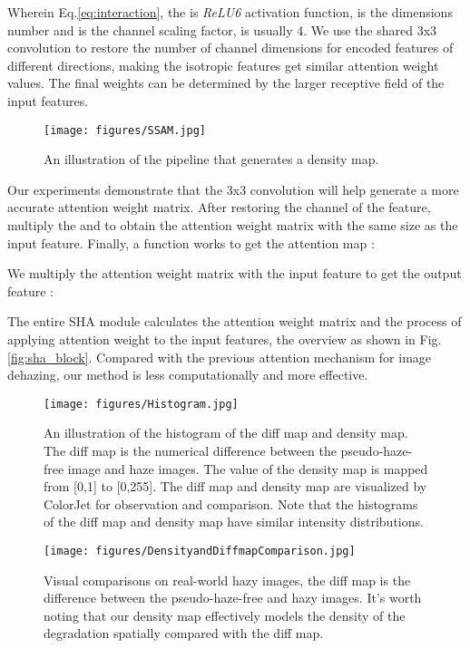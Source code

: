 \documentclass[final]{cvpr}
\begin{document}
Wherein Eq.\ref{eq:interaction}, the  is \textit{ReLU6} activation function,  is the dimensions number and  is the channel scaling factor,  is usually 4.
We use the shared 3x3 convolution to restore the number of channel dimensions for encoded features of different directions, making the isotropic features get similar attention weight values. The final weights can be determined by the larger receptive field of the input features.

\begin{figure}[b]
    \centering
    \texttt{[image: figures/SSAM.jpg]}
    \caption{An illustration of the pipeline that generates a density map.}
    \label{fig:supervision_mask}
\end{figure}
Our experiments demonstrate that the 3x3 convolution will help generate a more accurate attention weight matrix. After restoring the channel of the feature, multiply the  and  to obtain the attention weight matrix with the same size as the input feature. Finally, a  function works to get the attention map :

We multiply the attention weight matrix  with the input feature  to get the output feature :

The entire SHA module calculates the attention weight matrix and the process of applying attention weight to the input features, the overview as shown in Fig.\ref{fig:sha_block}. Compared with the previous attention mechanism for image dehazing, our method is less computationally and more effective.

\begin{figure}[t]
    \centering
    \texttt{[image: figures/Histogram.jpg]}
    \caption{An illustration of the histogram of the diff map and density map. The diff map is the numerical difference between the pseudo-haze-free image and haze images. The value of the density map is mapped from [0,1] to [0,255]. The diff map and density map are visualized by ColorJet for observation and comparison. Note that the histograms of the diff map and density map have similar intensity distributions.}
    \label{fig:histogram}
\end{figure}



\begin{figure*}
    \centering
    \texttt{[image: figures/DensityandDiffmapComparison.jpg]}
    \caption{Visual comparisons on real-world hazy images, the diff map is the difference between the pseudo-haze-free and hazy images. It's worth noting that our density map effectively models the density of the degradation spatially compared with the diff map.}
    \label{fig:densitymap_comparison}
\end{figure*}
\end{document}

